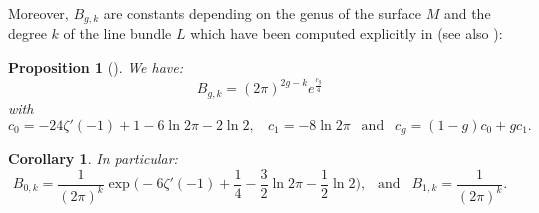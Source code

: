 \documentclass{article}
\newtheorem{Proposition}[theorem]{Proposition}
\newtheorem{Corollary}[theorem]{Corollary}
\theoremstyle{definition}
\theoremstyle{remark}
\begin{document}
Moreover, $B_{g,k}$ are constants depending on the genus of the surface $M$ and the degree $k$ of the line bundle $L$ which have been computed explicitly in \cite{WentworthGluing} (see also \cite{GilletSoulAnalyticTorsionToddGenus}):
\begin{Proposition}[{\cite[Corollary 1.1]{WentworthGluing}}]\label{ConstantesWentworth}
    We have: $$B_{g,k}=(2\pi)^{2g-k}e^{\frac{c_{g}}{4}}$$ with $$c_{0}=-24\zeta'(-1)+1-6\ln2\pi-2\ln2, ~~  ~~ c_{1}=-8\ln2\pi ~~ \text{ and } ~~c_{g}=(1-g)c_{0}+gc_{1}.$$ \end{Proposition}

\begin{Corollary}
    In particular: $$B_{0,k}=\frac{1}{(2\pi)^{k}}\exp\bigg(-6\zeta'(-1)+\frac{1}{4}-\frac{3}{2}\ln2\pi -\frac{1}{2}\ln2\bigg),~~ \text{ and }~~ B_{1,k}=\frac{1}{(2\pi)^{k}}.$$
\end{Corollary}
\end{document}
